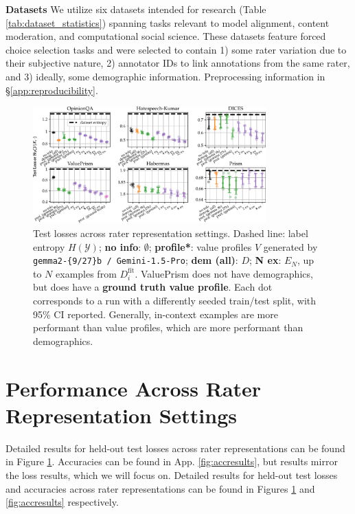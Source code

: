 \documentclass[11pt]{article}
\begin{document}
\textbf{Datasets }
We utilize six datasets 
intended for research
(Table \ref{tab:dataset_statistics}) spanning tasks relevant to model alignment, content moderation, and computational social science. These datasets feature forced choice selection tasks and were selected to contain 1) some rater variation due to their subjective nature, 2) annotator IDs to link annotations from the same rater, and 3) ideally, some demographic information.
Preprocessing information in \S \ref{app:reproducibility}.

\begin{figure}[t]
\centering
\includegraphics[width=0.8\textwidth]{files/nll-short.pdf}
\caption{
Test losses across rater representation settings. Dashed line: label entropy $H(\mathcal{Y})$; {\bf no info}: $\emptyset$; \textcolor{profcolor}{\bf profile*}: value profiles $V$ generated by \texttt{gemma2-\{9/27\}b / Gemini-1.5-Pro}; \textcolor{demcolor}{\bf dem (all)}: $D$; \textcolor{excolor}{\bf N ex}: $E_N$, up to $N$ examples from $D_i^\textrm{fit}$. ValuePrism does not have demographics, but does have a \textcolor{gtcolor}{\bf ground truth value profile}. Each dot corresponds to a run with a differently seeded train/test split, with 95\% CI reported.
Generally, in-context examples are more performant than value profiles, which are more performant than demographics.
}
\label{fig:nllresults}
\end{figure}


\section{Performance Across Rater Representation Settings}
\label{sec:results-ratererep}
Detailed results for held-out test losses across rater representations can be found in Figure \ref{fig:nllresults}. Accuracies can be found in App. \ref{fig:accresults}, but results mirror the loss results, which we will focus on.
Detailed results for held-out test losses and accuracies across rater representations can be found in Figures \ref{fig:nllresults} and \ref{fig:accresults} respectively.
\end{document}
